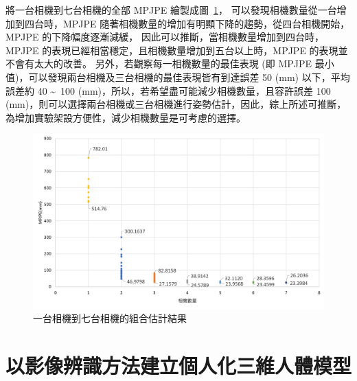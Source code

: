 將一台相機到七台相機的全部 MPJPE 繪製成圖~\ref{ch3_fig_1to7cam}，
可以發現相機數量從一台增加到四台時，MPJPE 隨著相機數量的增加有明顯下降的趨勢，從四台相機開始，MPJPE 的下降幅度逐漸減緩，
因此可以推斷，當相機數量增加到四台時，MPJPE 的表現已經相當穩定，且相機數量增加到五台以上時，MPJPE 的表現並不會有太大的改善。
另外，若觀察每一相機數量的最佳表現 (即 MPJPE 最小值)，可以發現兩台相機及三台相機的最佳表現皆有到達誤差 50 (mm) 以下，平均誤差約 40 \textasciitilde\ 100 (mm)，所以，若希望盡可能減少相機數量，且容許誤差 100 (mm)，則可以選擇兩台相機或三台相機進行姿勢估計，因此，綜上所述可推斷，為增加實驗架設方便性，減少相機數量是可考慮的選擇。
\begin{figure}[!ht]
   \centering
   \includegraphics[width=13cm]{figure/ch3_fig_1to7cam.png}
   \caption[一台相機到七台相機的組合估計結果]{一台相機到七台相機的組合估計結果}
   \label{ch3_fig_1to7cam}
\end{figure}

\clearpage

\section{以影像辨識方法建立個人化三維人體模型}\label{ch4_skeleton_exp}

